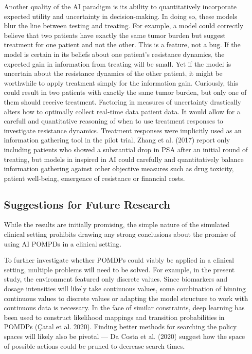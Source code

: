 \documentclass[
]{article}
\begin{document}
Another quality of the AI paradigm is its ability to quantitatively
incorporate expected utility and uncertainty in decision-making. In
doing so, these models blur the line between testing and treating. For
example, a model could correctly believe that two patients have exactly
the same tumor burden but suggest treatment for one patient and not the
other. This is a feature, not a bug. If the model is certain in its
beliefs about one patient's resistance dynamics, the expected gain in
information from treating will be small. Yet if the model is uncertain
about the resistance dynamics of the other patient, it might be
worthwhile to apply treatment simply for the information gain.
Curiously, this could result in two patients with exactly the same tumor
burden, but only one of them should receive treatment. Factoring in
measures of uncertainty drastically alters how to optimally collect
real-time data patient data. It would allow for a carefull and
quantitative reasoning of when to use treatment responses to investigate
resistance dynamics. Treatment responses were implicitly used as an
information gathering tool in the pilot trial, Zhang et al. (2017)
report only including patients who showed a substantial drop in PSA
after an initial round of treating, but models in inspired in AI could
carefully and quantitatively balance information gathering against other
objective measures such as drug toxicity, patient well-being, emergence
of resistance or financial costs.

\subsection{Suggestions for Future
Research}\label{suggestions-for-future-research}

While the results are initially promising, the simple nature of the
simulated clinical setting prohibits drawing any strong conclusions
about the promise of using AI POMPDs in a clinical setting.

To further investigate whether POMDPs could viably be applied in a
clinical setting, multiple problems will need to be solved. For example,
in the present study, the environment featured only discrete values.
Since biomarkers and dosage intensities will likely take continuous
values, some combination of binning continuous values to discrete values
or adapting the model structure to work with continuous data is
necessary. In the face of similar constraints, deep learning has been
used to construct likelihood mappings and transition probabilities in
POMDPs (Çatal et al. 2020). Finding better methods for searching the
policy spaces will likely also be pivotal --- Da Costa et al. (2020)
suggest how the space of possible actions could be pruned to decrease
search times.
\end{document}
